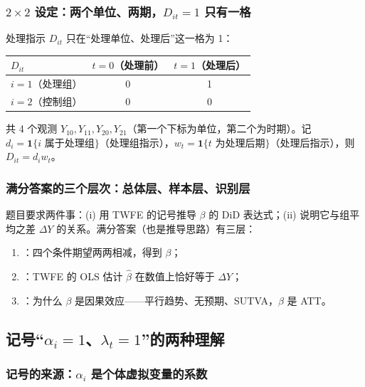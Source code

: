 \subsubsection{\texorpdfstring{$2\times2$}{2x2} 设定：两个单位、两期，\texorpdfstring{$D_{it}=1$}{D=1} 只有一格}

处理指示 $D_{it}$ 只在“处理单位、处理后”这一格为 1：
\begin{center}
\begin{tabular}{lcc}
\toprule
$D_{it}$ & $t=0$（处理前） & $t=1$（处理后）\\
\midrule
$i=1$（处理组） & 0 & 1\\
$i=2$（控制组） & 0 & 0\\
\bottomrule
\end{tabular}
\end{center}
共 4 个观测 $Y_{10},Y_{11},Y_{20},Y_{21}$（第一个下标为单位，第二个为时期）。记 $d_i=\mathbf{1}\{i\text{ 属于处理组}\}$（处理组指示），$w_t=\mathbf{1}\{t\text{ 为处理后期}\}$（处理后指示），则 $D_{it}=d_iw_t$。

\subsubsection{满分答案的三个层次：总体层、样本层、识别层}

题目要求两件事：(i) 用 TWFE 的记号推导 $\beta$ 的 DiD 表达式；(ii) 说明它与组平均之差 $\Delta Y$ 的关系。满分答案（也是推导思路）有三层：
\begin{enumerate}
  \item {}：四个条件期望两两相减，得到 $\beta$；
  \item {}：TWFE 的 OLS 估计 $\hat\beta$ 在数值上恰好等于 $\Delta Y$；
  \item {}：为什么 $\beta$ 是因果效应——平行趋势、无预期、SUTVA，$\beta$ 是 ATT。
\end{enumerate}

\subsection{记号“\texorpdfstring{$\alpha_i=1$、$\lambda_t=1$}{alpha\_i=1, lambda\_t=1}”的两种理解}\label{sec:U17b-notation}

\subsubsection{记号的来源：\texorpdfstring{$\alpha_i$}{alpha\_i} 是个体虚拟变量的系数}

